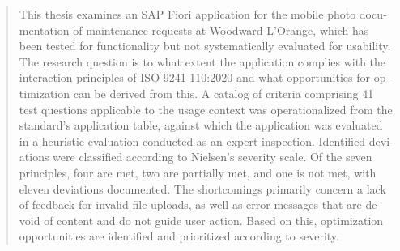 \begin{abstract}
\begin{otherlanguage}{english}
This thesis examines an SAP Fiori application for the mobile photo documentation of maintenance requests 
at Woodward L'Orange, which has been tested for functionality but not systematically evaluated for usability.
The research question is to what extent the application complies with the interaction principles of ISO 9241-110:2020 and what 
opportunities for optimization can be derived from this.
A catalog of criteria comprising 41 test questions applicable to the usage context was operationalized from the standard’s application table, 
against which the application was evaluated in a heuristic evaluation conducted as an expert inspection.
Identified deviations were classified according to Nielsen’s severity scale.
Of the seven principles, four are met, two are partially met, and one is not met, 
with eleven deviations documented.
The shortcomings primarily concern a lack of feedback for invalid file uploads, as well as error messages that are devoid of content 
and do not guide user action.
Based on this, optimization opportunities are identified and prioritized according to severity.
\end{otherlanguage}
\end{abstract}
